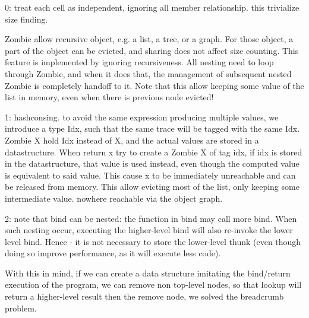 0: treat each cell as independent, ignoring all member relationship.
this trivialize size finding.

Zombie allow recursive object, e.g. a list, a tree, or a graph.
For those object, a part of the object can be evicted, and sharing does not affect size counting.
This feature is implemented by ignoring recursiveness. All nesting need to loop through Zombie, and when it does that, the management of subsequent nested Zombie is completely handoff to it.
Note that this allow keeping some value of the list in memory, even when there is previous node evicted!

1: hashconsing. to avoid the same expression producing multiple values, we introduce a type Idx, such that the same trace will be tagged with the same Idx.
Zombie X hold Idx instead of X, and the actual values are stored in a datastructure.
When return x try to create a Zombie X of tag idx, if idx is stored in the datastructure, that value is used instead, even though the computed value is equivalent to said value. This cause x to be immediately unreachable and can be released from memory. This allow evicting most of the list, only keeping some intermediate value. nowhere reachable via the object graph.

2: note that bind can be nested: the function in bind may call more bind. When such nesting occur, executing the higher-level bind will also re-invoke the lower level bind. Hence - it is not necessary to store the lower-level thunk (even though doing so improve performance, as it will execute less code).

With this in mind, if we can create a data structure imitating the bind/return execution of the program, we can remove non top-level nodes, so that lookup will return a higher-level result then the remove node, we solved the breadcrumb problem.